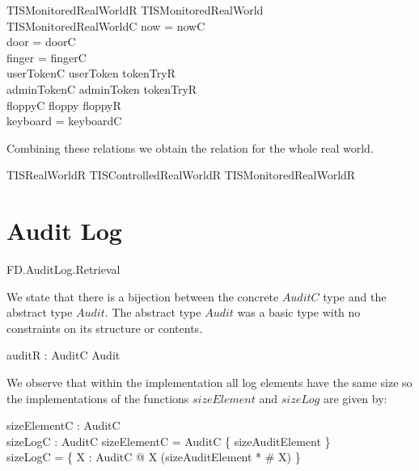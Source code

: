 \begin{schema}{TISMonitoredRealWorldR}
        TISMonitoredRealWorld
\\      TISMonitoredRealWorldC
\where
        now = nowC
\\      door = doorC
\\      finger = fingerC
\\      userTokenC \mapsto userToken \in tokenTryR
\\      adminTokenC \mapsto adminToken \in tokenTryR
\\      floppyC \mapsto floppy \in floppyR
\\      keyboard = keyboardC            
\end{schema}

Combining these relations we obtain the relation for the whole real world.

\begin{zed}
        TISRealWorldR  TISControlledRealWorldR \land TISMonitoredRealWorldR
\end{zed}
\section{Audit Log}

\begin{traceunit}{FD.AuditLog.Retrieval}
\end{traceunit}

We state that there is a bijection between the concrete $AuditC$ type
and the abstract type $Audit$. The abstract type $Audit$ was a basic
type with no constraints on its structure or contents.

\begin{axdef}
        auditR : AuditC \bij Audit
\end{axdef}

We observe that within the implementation all log elements have the same
size so the implementations of the functions $sizeElement$ and
$sizeLog$ are given by:

\begin{axdef}
        sizeElementC : AuditC \fun \nat
\\      sizeLogC : \finset AuditC \fun \nat
\where
        sizeElementC = AuditC \cross \{ sizeAuditElement \}
\\      sizeLogC = \{ X : \finset AuditC @ X \mapsto (sizeAuditElement *
\# X) \}
\end{axdef}


